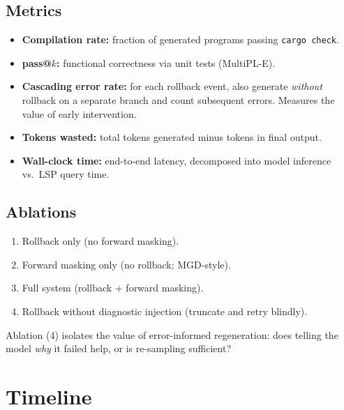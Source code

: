 \documentclass[11pt,letterpaper]{article}
\begin{document}
\subsection{Metrics}
\begin{itemize}[leftmargin=*,itemsep=2pt]
  \item \textbf{Compilation rate:} fraction of generated programs passing \texttt{cargo check}.
  \item \textbf{pass@$k$:} functional correctness via unit tests (MultiPL-E).
  \item \textbf{Cascading error rate:} for each rollback event, also generate \emph{without} rollback on a separate branch and count subsequent errors. Measures the value of early intervention.
  \item \textbf{Tokens wasted:} total tokens generated minus tokens in final output.
  \item \textbf{Wall-clock time:} end-to-end latency, decomposed into model inference vs.\ LSP query time.
\end{itemize}

\subsection{Ablations}
\begin{enumerate}[leftmargin=*,itemsep=2pt]
  \item Rollback only (no forward masking).
  \item Forward masking only (no rollback; MGD-style).
  \item Full system (rollback + forward masking).
  \item Rollback without diagnostic injection (truncate and retry blindly).
\end{enumerate}
Ablation (4) isolates the value of error-informed regeneration: does telling the model \emph{why} it failed help, or is re-sampling sufficient?

\section{Timeline}
\end{document}

